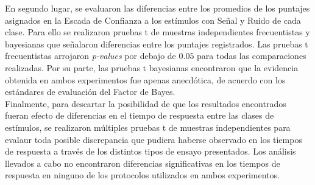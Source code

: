 En segundo lugar, se evaluaron las diferencias entre los promedios de los puntajes asignados en la Escada de Confianza a los estímulos con Señal y Ruido de cada clase. Para ello se realizaron pruebas t de muestras independientes frecuentistas y bayesianas que señalaron diferencias entre los puntajes registrados. Las pruebas t frecuentistas arrojaron \textit{p-values} por debajo de $0.05$ para todas las comparaciones realizadas. Por su parte, las pruebas t bayesianas encontraron que la evidencia obtenida en ambos experimentos fue apenas anecdótica, de acuerdo con los estándares de evaluación del Factor de Bayes.\\

Finalmente, para descartar la posibilidad de que los resultados encontrados fueran efecto de diferencias en el tiempo de respuesta entre las clases de estímulos, se realizaron múltiples pruebas t de muestras independientes para evalaur toda posible discrepancia que pudiera haberse observado en los tiempos de respuesta a través de los distintos tipos de ensayo presentados. Los análisis llevados a cabo no encontraron diferencias significativas en los tiempos de respuesta en ninguno de los protocolos utilizados en ambos experimentos.


